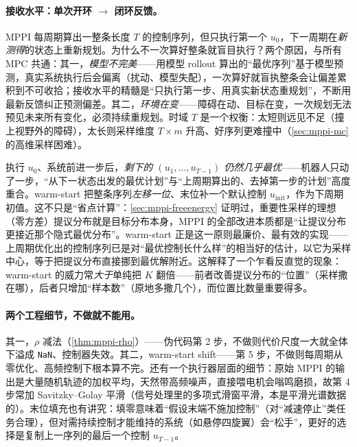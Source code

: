 \paragraph{接收水平：单次开环 $\to$ 闭环反馈。}MPPI 每周期算出一整条长度 $T$ 的控制序列，但只执行第一个 $u_0$，下一周期在\emph{新测得}的状态上重新规划。为什么不一次算好整条就盲目执行？两个原因，与所有 MPC 共通：其一，\emph{模型不完美}——用模型 rollout 算出的“最优序列”基于模型预测，真实系统执行后会偏离（扰动、模型失配），一次算好就盲执整条会让偏差累积到不可收拾；接收水平的精髓是“只执行第一步、用真实新状态重规划”，不断用最新反馈纠正预测偏差。其二，\emph{环境在变}——障碍在动、目标在变，一次规划无法预见未来所有变化，必须持续重规划。时域 $T$ 是一个权衡：太短则远见不足（撞上视野外的障碍），太长则采样维度 $T\times m$ 升高、好序列更难撞中（\cref{sec:mppi-mc} 的高维采样困难）。

\begin{insight}
执行 $u_0$、系统前进一步后，\emph{剩下的 $(u_1,\dots,u_{T-1})$ 仍然几乎最优}——机器人只动了一步，“从下一状态出发的最优计划”与“上周期算出的、去掉第一步的计划”高度重合。warm-start 把整条序列\emph{左移一位}、末位补一个默认控制 $u_{\text{init}}$，作为下周期初值。这不只是“省点计算”：\cref{sec:mppi-freeenergy} 证明过，重要性采样的理想（零方差）提议分布就是目标分布本身，MPPI 的全部改进本质都是“让提议分布更接近那个隐式最优分布”。warm-start 正是这一原则最廉价、最有效的实现——上周期优化出的控制序列已是对“最优控制长什么样”的相当好的估计，以它为采样中心，等于把提议分布直接挪到最优解附近。这解释了一个乍看反直觉的现象：warm-start 的威力常\emph{大于}单纯把 $K$ 翻倍——前者改善提议分布的“位置”（采样撒在哪），后者只增加“样本数”（原地多撒几个），而位置比数量重要得多。
\end{insight}

\paragraph{两个工程细节，不做就不能用。}其一，$\rho$ 减法（\cref{thm:mppi-rho}）——伪代码第 2 步，不做则代价尺度一大就全体下溢成 \texttt{NaN}、控制器失效。其二，warm-start shift——第 5 步，不做则每周期从零优化、高频控制下根本算不完。还有一个执行器层面的细节：原始 MPPI 的输出是大量随机轨迹的加权平均，天然带高频噪声，直接喂电机会嗡鸣磨损，故第 4 步常加 Savitzky--Golay 平滑\cite{savitzky1964smoothing}（信号处理里的多项式滑窗平滑，本是平滑光谱数据的）。末位填充也有讲究：填零意味着“假设末端不施加控制”（对“减速停止”类任务合理），但对需持续控制才能维持的系统（如悬停四旋翼）会“松手”，更好的选择是复制上一序列的最后一个控制 $u_{T-1}$。

